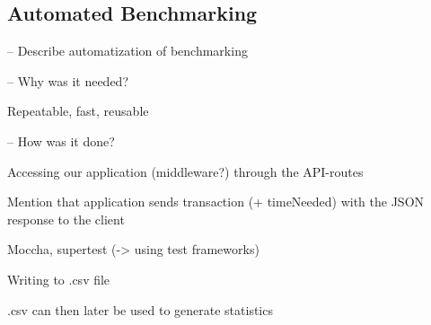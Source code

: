 \subsection{Automated Benchmarking}

-- Describe automatization of benchmarking

-- Why was it needed?

Repeatable, fast, reusable

-- How was it done?

Accessing our application (middleware?) through the API-routes

Mention that application sends transaction (+ timeNeeded) with the JSON response to the client

Moccha, supertest (-> using test frameworks)

Writing to .csv file

.csv can then later be used to generate statistics
